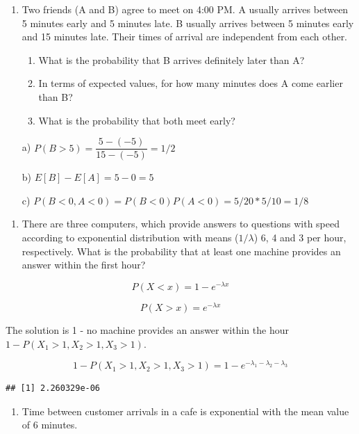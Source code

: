 \documentclass[]{book}
\providecommand{\tightlist}{%
  \setlength{\itemsep}{0pt}\setlength{\parskip}{0pt}}
\theoremstyle{definition}
\theoremstyle{definition}
\theoremstyle{definition}
\theoremstyle{remark}
\begin{document}
\begin{enumerate}
\def\labelenumi{\arabic{enumi}.}
\item
  Two friends (A and B) agree to meet on 4:00 PM. A usually arrives
  between 5 minutes early and 5 minutes late. B usually arrives between
  5 minutes early and 15 minutes late. Their times of arrival are
  independent from each other.

  \begin{enumerate}
  \def\labelenumii{\alph{enumii})}
  \tightlist
  \item
    What is the probability that B arrives definitely later than A?
  \item
    In terms of expected values, for how many minutes does A come
    earlier than B?
  \item
    What is the probability that both meet early?
  \end{enumerate}

  a) \(P(B > 5) = \dfrac{5 - (-5)}{15 - (-5)} = 1/2\)

  b) \(E[B] - E[A] = 5 - 0 = 5\)

  c) \(P(B < 0, A < 0) = P(B < 0) P(A < 0) = 5/20 * 5/10 = 1/8\)
\end{enumerate}

\begin{enumerate}
\def\labelenumi{\arabic{enumi}.}
\setcounter{enumi}{1}
\tightlist
\item
  There are three computers, which provide answers to questions with
  speed according to exponential distribution with means (\(1/\lambda\))
  6, 4 and 3 per hour, respectively. What is the probability that at
  least one machine provides an answer within the first hour?
\end{enumerate}

\[P(X < x) = 1 - e^{-\lambda x}\]

\[P(X > x) = e^{-\lambda x}\]

The solution is 1 - no machine provides an answer within the hour
\(1 - P(X_1 > 1, X_2 > 1, X_3 > 1)\).

\[1 - P(X_1 > 1, X_2 > 1, X_3 > 1) = 1 - e^{-\lambda_1 - \lambda_2 - \lambda_3}\]

\begin{verbatim}
## [1] 2.260329e-06
\end{verbatim}

\begin{enumerate}
\def\labelenumi{\arabic{enumi}.}
\setcounter{enumi}{2}
\tightlist
\item
  Time between customer arrivals in a cafe is exponential with the mean
  value of 6 minutes.
\end{enumerate}
\end{document}
